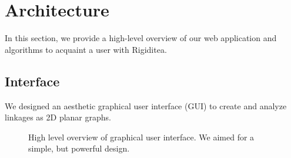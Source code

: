 \documentclass[aps,prd,final,twocolumn,letterpaper,nofootinbib]{revtex4-1}
\begin{document}
\section{Architecture}
\label{sec:arch}

In this section, we provide a high-level overview of our web application
and algorithms to acquaint a user with Rigiditea.

\subsection{Interface}

We designed an aesthetic graphical user interface (GUI)
to create and analyze linkages as 2D planar graphs.

\begin{figure}[ht]
\caption{High level overview of graphical user interface.
We aimed for a simple, but powerful design.}
\label{fig:ui}
\end{figure}
\end{document}
